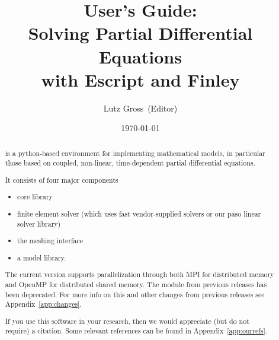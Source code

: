 \documentclass{manual}
\title{\module{esys} User's Guide:\\ Solving Partial Differential Equations\\ with Escript and Finley}
\author{Lutz Gross\etal~(Editor)}
\date{\today}
\begin{document}
\maketitle



\begin{abstract}
\escript is a python-based environment for implementing mathematical models, in particular those based on coupled, non-linear, time-dependent partial differential equations.

It consists of four major components
\begin{itemize}
\item \escript core library
\item finite element solver \finley (which uses fast vendor-supplied solvers or our paso linear solver library)
\item the meshing interface \pycad
\item a model library.
\end{itemize}
The current version supports parallelization through both MPI for distributed memory and OpenMP for distributed shared memory. 
The \pyvisi module from previous releases has been deprecated.
For more info on this and other changes from previous releases see Appendix~\ref{app:changes}.

If you use this software in your research, then we would appreciate (but do not require) a citation.
Some relevant references can be found in Appendix~\ref{app:ourrefs}.
\end{abstract}

\tableofcontents














\appendix

%





\makemodindex

\printindex
%



\end{document}

